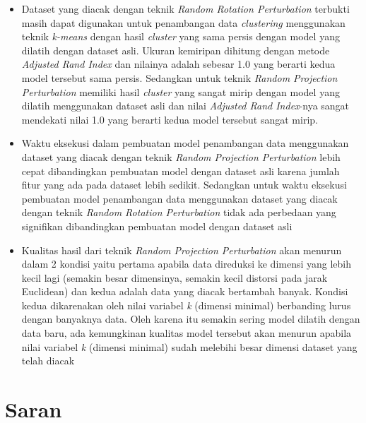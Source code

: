 \begin{itemize}
    \item Dataset yang diacak dengan teknik \textit{Random Rotation Perturbation} terbukti masih dapat digunakan untuk penambangan data \textit{clustering} menggunakan teknik \textit{k-means} dengan hasil \textit{cluster} yang sama persis dengan model yang dilatih dengan dataset asli. Ukuran kemiripan dihitung dengan metode \textit{Adjusted Rand Index} dan nilainya adalah sebesar 1.0 yang berarti kedua model tersebut sama persis. Sedangkan untuk teknik \textit{Random Projection Perturbation} memiliki hasil \textit{cluster} yang sangat mirip dengan model yang dilatih menggunakan dataset asli dan nilai \textit{Adjusted Rand Index}-nya sangat mendekati nilai 1.0 yang berarti kedua model tersebut sangat mirip.
    \item Waktu eksekusi dalam pembuatan model penambangan data menggunakan dataset yang diacak dengan teknik \textit{Random Projection Perturbation} lebih cepat dibandingkan pembuatan model dengan dataset asli karena jumlah fitur yang ada pada dataset lebih sedikit. Sedangkan untuk waktu eksekusi pembuatan model penambangan data menggunakan dataset yang diacak dengan teknik \textit{Random Rotation Perturbation} tidak ada perbedaan yang signifikan dibandingkan pembuatan model dengan dataset asli
    \item Kualitas hasil dari teknik \textit{Random Projection Perturbation} akan menurun dalam 2 kondisi yaitu pertama apabila data direduksi ke dimensi yang lebih kecil lagi (semakin besar dimensinya, semakin kecil distorsi pada jarak Euclidean) dan kedua adalah data yang diacak bertambah banyak. Kondisi kedua dikarenakan oleh nilai variabel \textit{k} (dimensi minimal) berbanding lurus dengan banyaknya data. Oleh karena itu semakin sering model dilatih dengan data baru, ada kemungkinan kualitas model tersebut akan menurun apabila nilai variabel \textit{k} (dimensi minimal) sudah melebihi besar dimensi dataset yang telah diacak
\end{itemize}

\section{Saran}
\label{sec:saran}

